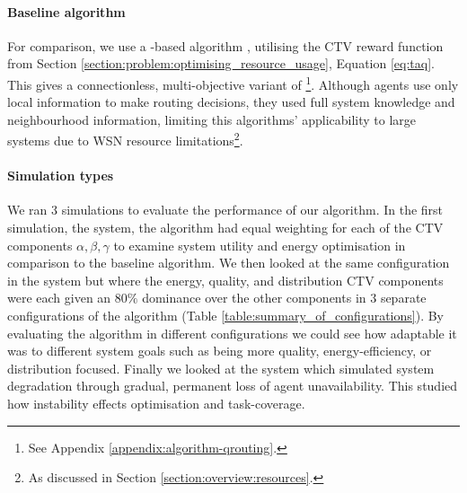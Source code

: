 \paragraph{Baseline algorithm}
For comparison, we use a \acronymBaseline{}{}-based algorithm \citep{Boyan, Zhang2004, Al-Rawi2015}, utilising the CTV reward function from Section \ref{section:problem:optimising_resource_usage}, Equation \ref{eq:taq}. This gives a connectionless, multi-objective variant of \acronymBaseline{}{}\footnote{See Appendix \ref{appendix:algorithm-qrouting}.}. Although agents use only local information to make routing decisions, they used full system knowledge and neighbourhood information, limiting this algorithms' applicability to large systems due to WSN resource limitations\footnote{As discussed in Section \ref{section:overview:resources}.}. 

\paragraph{Simulation types}
We ran $3$ simulations to evaluate the performance of our algorithm. In the first simulation, the \simulationSimple{}{} system,  the \acronymWSNOptimisation{}{} algorithm had
equal weighting for each of the CTV components $\alpha, \beta, \gamma$ to examine system utility and energy optimisation in comparison to the \acronymBaseline{}{} baseline algorithm.  We then looked at the same configuration in the \simulationExtended{}{} system but where the energy, quality, and distribution CTV components were each given an $80\%$ dominance over the other components in $3$ separate configurations of the algorithm (Table \ref{table:summary_of_configurations}). By evaluating the algorithm in different configurations we could see how adaptable it was to different system goals such as being more quality, energy-efficiency, or distribution focused. Finally we looked at the \simulationNodeFailure{}{} system which simulated system degradation through gradual, permanent loss of agent unavailability. This studied how instability effects optimisation and task-coverage.  

